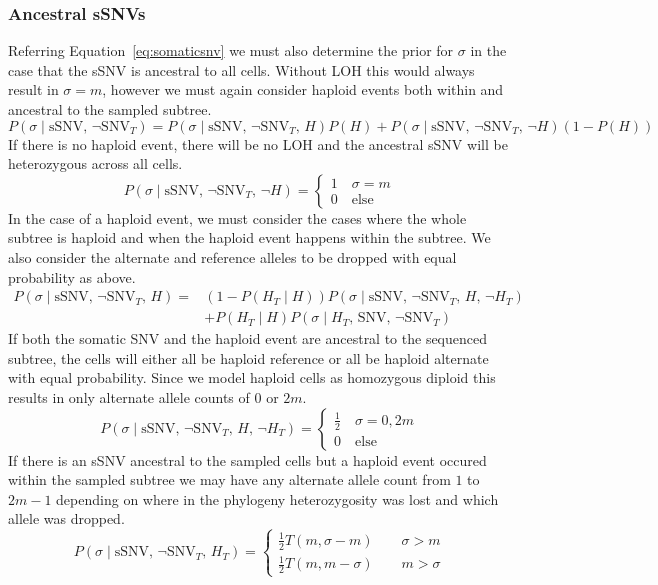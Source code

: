 \documentclass[../../main.tex]{subfiles}
\begin{document}
\subsubsection*{Ancestral sSNVs}
Referring Equation~\eqref{eq:somaticsnv} we must also determine the prior for $\sigma$ in the case that the sSNV is ancestral to all cells. Without LOH this would always result in $\sigma=m$, however we must again consider haploid events both within and ancestral to the sampled subtree.
\begin{equation} \label{eq:ancestralsnv}
P(\sigma\mid\text{sSNV},\,\neg\text{SNV}_T)=P(\sigma\mid\text{sSNV},\,\neg\text{SNV}_T,\,H)P(H)+P(\sigma\mid\text{sSNV},\,\neg\text{SNV}_T,\,\neg H)(1-P(H))
\end{equation}
If there is no haploid event, there will be no LOH and the ancestral sSNV will be heterozygous across all cells.
\begin{equation*}
P(\sigma\mid\text{sSNV},\,\neg\text{SNV}_T,\,\neg H) = \begin{cases}1\quad \sigma=m\\ 0\quad\text{else}\end{cases}
\end{equation*}
In the case of a haploid event, we must consider the cases where the whole subtree is haploid and when the haploid event happens within the subtree. We also consider the alternate and reference alleles to be dropped with equal probability as above.
\begin{align*}
P(\sigma\mid\text{sSNV},\,\neg\text{SNV}_T,\,H)=&(1-P(H_T\mid H))P(\sigma\mid \text{sSNV},\,\neg\text{SNV}_T,\,H,\,\neg H_T)\\
&+P(H_T\mid H)P(\sigma\mid H_T,\,\text{SNV},\,\neg\text{SNV}_T)
\end{align*}
If both the somatic SNV and the haploid event are ancestral to the sequenced subtree, the cells will either all be haploid reference or all be haploid alternate with equal probability. Since we model haploid cells as homozygous diploid this results in only alternate allele counts of $0$ or $2m$.
\begin{equation*}
P(\sigma\mid\text{sSNV},\,\neg\text{SNV}_T,\,H,\,\neg H_T)= \begin{cases} \frac{1}{2} \quad \sigma=0,2m\\0\quad \text{else} \end{cases}
\end{equation*}
If there is an sSNV ancestral to the sampled cells but a haploid event occured within the sampled subtree we may have any alternate allele count from $1$ to $2m-1$ depending on where in the phylogeny heterozygosity was lost and which allele was dropped.
\begin{equation*}
P(\sigma\mid\text{sSNV},\,\neg\text{SNV}_T,\,H_T) = \begin{cases} \frac{1}{2}T(m,\sigma-m)\qquad \sigma > m\\
\frac{1}{2}T(m,m-\sigma)\qquad m > \sigma \end{cases}
\end{equation*}
\end{document}
